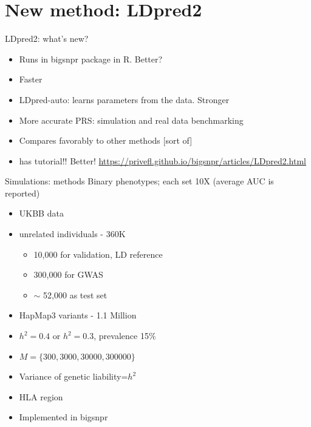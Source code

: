 \documentclass{beamer}
\begin{document}
  \section{New method: LDpred2}   
  \begin{frame}{LDpred2: what's new?}
    \begin{itemize}
        \item Runs in bigsnpr package in \alert{R}. \alert{Better?}
        \item \alert{Faster}
        \item LDpred-auto: learns parameters from the data. \alert{Stronger}
        \item \alert{More accurate} PRS: simulation and real data benchmarking
        \item Compares favorably to other methods [sort of] 
        \item \alert{has tutorial}!! \alert{Better!} \url{https://privefl.github.io/bigsnpr/articles/LDpred2.html}
    \end{itemize}

  \end{frame}
    \begin{frame}[t]{Simulations: methods}
            Binary phenotypes; each set 10X (average AUC is reported)
        \begin{itemize}
         \item UKBB data
         \item unrelated individuals - 360K
          \begin{itemize}
                    \item 10,000 for validation, LD reference
                    \item 300,000 for GWAS
                    \item $\sim$ 52,000 as test set 
                    \end{itemize}
            
         \item HapMap3 variants - 1.1 Million

                  \item $h^2=0.4$ or $h^2=0.3$, prevalence 15\%
                  \item $M=\{300,3000,30000,300000\}$
                  \item Variance of genetic liability=$h^2$
                  \item HLA region
                  \item Implemented in bigsnpr
              \end{itemize}
    \end{frame}
    
\end{document}
